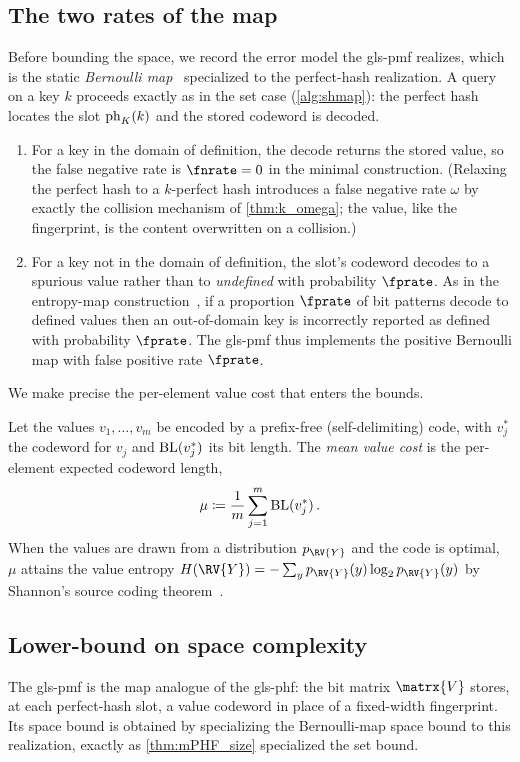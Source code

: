 \documentclass[ ../main.tex]{subfiles}
\begin{document}
\subsection{The two rates of the map}
\label{sec:pmf_rates}
Before bounding the space, we record the error model the \gls{gls-pmf} realizes, which is the static \emph{Bernoulli map}~\cite{bmaps} specialized to the perfect-hash realization. A query on a key $k$ proceeds exactly as in the set case (\cref{alg:shmap}): the perfect hash locates the slot $\operatorname{ph}_K(k)$ and the stored codeword is decoded.
\begin{enumerate}
    \item For a key in the domain of definition, the decode returns the stored value, so the false negative rate is $\fnrate = 0$ in the minimal construction. (Relaxing the perfect hash to a $k$-perfect hash introduces a false negative rate $\omega$ by exactly the collision mechanism of \cref{thm:k_omega}; the value, like the fingerprint, is the content overwritten on a collision.)
    \item For a key not in the domain of definition, the slot's codeword decodes to a spurious value rather than to \emph{undefined} with probability $\fprate$. As in the entropy-map construction~\cite{bmaps,emaps}, if a proportion $\fprate$ of bit patterns decode to defined values then an out-of-domain key is incorrectly reported as defined with probability $\fprate$. The \gls{gls-pmf} thus implements the positive Bernoulli map with false positive rate $\fprate$.
\end{enumerate}

We make precise the per-element value cost that enters the bounds.
\begin{definition}
\label{def:mu}
Let the values $v_1,\ldots,v_m$ be encoded by a prefix-free (self-delimiting) code, with $v_j^*$ the codeword for $v_j$ and $\operatorname{BL}(v_j^*)$ its bit length. The \emph{mean value cost} is the per-element expected codeword length,
\begin{equation}
\label{eq:mu_def}
    \mu \coloneqq \frac{1}{m}\sum_{j=1}^{m} \operatorname{BL}(v_j^*)\,.
\end{equation}
When the values are drawn from a distribution $p_{\RV{Y}}$ and the code is optimal, $\mu$ attains the value entropy $H(\RV{Y}) = -\sum_y p_{\RV{Y}}(y)\log_2 p_{\RV{Y}}(y)$ by Shannon's source coding theorem~\cite{bmaps}.
\end{definition}

\subsection{Lower-bound on space complexity}
\label{sec:pmf_lower_bound}
The \gls{gls-pmf} is the map analogue of the \gls{gls-phf}: the bit matrix $\matrx{V}$ stores, at each perfect-hash slot, a value codeword in place of a fixed-width fingerprint. Its space bound is obtained by specializing the Bernoulli-map space bound to this realization, exactly as \cref{thm:mPHF_size} specialized the set bound.
\end{document}
